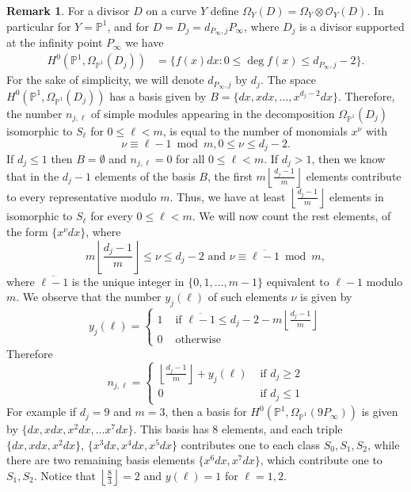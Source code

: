 \documentclass[11pt,letterpaper]{amsart}
\theoremstyle{definition}
\newtheorem{remark}[theorem]{Remark}
\newcommand{\lf}{\left\lfloor}
\newcommand{\rf}{\right\rfloor}
\renewcommand{\O}{{\mathcal{O}}}
\renewcommand{\mod}{\bmod}
\begin{document}
\begin{remark}
\label{remark-D}
For a divisor $D$ on a curve $Y$ define $\Omega_Y(D)=\Omega_Y\otimes \O_Y(D)$. In particular for  $Y=\mathbb{P}^1$, and for $D=D_j= d_{P_\infty,j} P_\infty$, where $D_j$ is a divisor supported at the infinity point $P_\infty$
 we have
\begin{align*}
H^0(\mathbb{P}^1,\Omega_{\mathbb{P}^1}(D_j))
&=\{ f(x) dx: 0 \leq \deg f(x) \leq d_{P_\infty,j}-2 \}.
\end{align*}
For the sake of simplicity, we will denote $d_{P_\infty,j}$ by $d_j$. The space $H^0(\mathbb{P}^1,\Omega_{\mathbb{P}^1}(D_j))$
 has a basis given by $B=\{dx,xdx,\ldots,x^{d_j-2}dx\}$. Therefore, 
the number $n_{j,\ell}$ of simple modules appearing in the decomposition $\Omega_{\mathbb{P}^1}(D_j)$ isomorphic to $S_\ell$ for $0\leq \ell < m$, is equal to the number of monomials $x^{\nu}$ with 
\[
\nu \equiv \ell-1 \mod m, 0\leq \nu \leq d_j-2.
\] 
If $d_j \leq 1$ then $B=\emptyset$ and $n_{j,\ell}=0$ for all $0\leq \ell <m$. If $d_j>1$, then we know that in the $d_j-1$ elements of the basis $B$, the first $m \lf \frac{d_j-1}{m} \rf$ elements  contribute to every representative modulo $m$. Thus, we have  at least $\lf \frac{d_j-1}{m} \rf$ elements in isomorphic to $S_\ell$ for every $0\leq \ell <m$. We will now count the rest elements, of the form $\{x^\nu dx\}$, where 
\[
  m \lf \frac{d_j-1}{m} \rf \leq \nu \leq d_j-2 \text{ and } \nu \equiv \overline{\ell-1} \mod m,
\]  
where  $\overline{\ell-1}$ is  the unique integer in $\{0,1,\ldots,m-1\}$ equivalent to $\ell-1$ modulo $m$. 
We observe that the number $y_j(\ell)$ of such elements $\nu$ is given by 
\[
  y_j(\ell) 
=
\begin{cases}
1 &  \text{ if } \overline{\ell-1} \leq d_j-2- m \lf \frac{d_j-1}{m} \rf
\\
0 & \text{ otherwise}
\end{cases}
\]
Therefore 
\[
n_{j,\ell}=
\begin{cases}
\lf \frac{d_j-1}{m}\rf +y_j(\ell) & \text{ if } d_j \geq 2
\\
0 & \text{ if } d_j \leq 1
\end{cases}
\]
For example if $d_j=9$ and $m=3$, then a basis for $H^0(\mathbb{P}^1,\Omega_{\mathbb{P}^1}(9P_\infty))$ is given by $\{dx,x dx,x^2dx,\ldots x^7dx\}$. This basis has $8$ elements, and each triple $\{dx,x dx,x^2 dx\}$, $\{x^3 dx,x^4 dx,x^5 dx\}$ contributes one to each class $S_0,S_1,S_2$, while there are two remaining basis elements $\{x^6dx,x^7dx\}$, which contribute one to $S_1,S_2$. Notice that $\lf \frac{8}{3} \rf=2$ and $y(\ell)=1$ for $\ell=1,2$.  



\end{remark}
\end{document}
